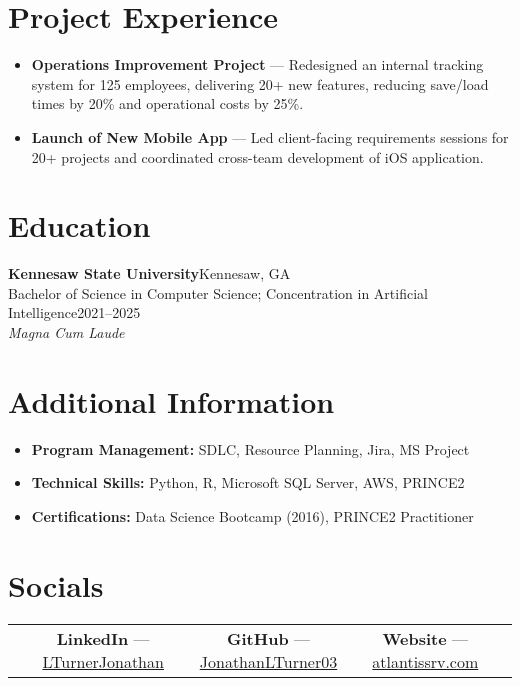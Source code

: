 \documentclass[letterpaper,10pt]{article}
\begin{document}
\section{Project Experience}
\begin{itemize}[leftmargin=*]
  \item \textbf{Operations Improvement Project} --- Redesigned an internal tracking system for 125 employees, delivering 20+ new features, reducing save/load times by 20\% and operational costs by 25\%.
  \item \textbf{Launch of New Mobile App} --- Led client-facing requirements sessions for 20+ projects and coordinated cross-team development of iOS application.
\end{itemize}


\section{Education}

\noindent\textbf{Kennesaw State University}\hfill Kennesaw, GA\\
Bachelor of Science in Computer Science; Concentration in Artificial Intelligence\hfill 2021--2025\\
\textit{Magna Cum Laude}

\section{Additional Information}
\begin{itemize}[leftmargin=*]
  \item \textbf{Program Management:} SDLC, Resource Planning, Jira, MS Project
  \item \textbf{Technical Skills:} Python, R, Microsoft SQL Server, AWS, PRINCE2
  \item \textbf{Certifications:} Data Science Bootcamp (2016), PRINCE2 Practitioner
\end{itemize}

\section{Socials}
\begin{center}
    \begin{tabular*}{\textwidth}{@{\extracolsep{\fill}} ccccc }
      \null &
      \textbf{LinkedIn} --- \href{https://linkedin.com/in/LTurnerJonathan}{LTurnerJonathan} &
      \textbf{GitHub} --- \href{https://github.com/JonathanLTurner03}{JonathanLTurner03} &
      \textbf{Website} --- \href{https://atlantissrv.com}{atlantissrv.com} & 
      \null \\
    \end{tabular*}
  \end{center}
\end{document}
